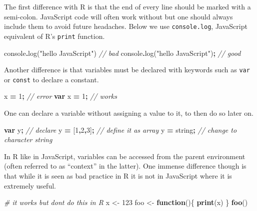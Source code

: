 \documentclass[
]{krantz}
\makeatletter
\newenvironment{Shaded}{\begin{snugshade}}{\end{snugshade}}
\newcommand{\BuiltInTok}[1]{#1}
\newcommand{\CommentTok}[1]{\textcolor[rgb]{0.37,0.37,0.37}{\textit{#1}}}
\newcommand{\ControlFlowTok}[1]{\textcolor[rgb]{0.27,0.27,0.27}{\textbf{#1}}}
\newcommand{\DecValTok}[1]{\textcolor[rgb]{0.06,0.06,0.06}{#1}}
\newcommand{\FunctionTok}[1]{\textcolor[rgb]{0,0,0}{#1}}
\newcommand{\KeywordTok}[1]{\textcolor[rgb]{0.27,0.27,0.27}{\textbf{#1}}}
\newcommand{\NormalTok}[1]{#1}
\newcommand{\OperatorTok}[1]{\textcolor[rgb]{0.43,0.43,0.43}{\textbf{#1}}}
\newcommand{\StringTok}[1]{\textcolor[rgb]{0.5,0.5,0.5}{#1}}
\newenvironment{kframe}{%
\medskip{}
\setlength{\fboxsep}{.8em}
 \def\at@end@of@kframe{}%
 \ifinner\ifhmode%
  \def\at@end@of@kframe{\end{minipage}}%
  \begin{minipage}{\columnwidth}%
 \fi\fi%
 \def\FrameCommand##1{\hskip\@totalleftmargin \hskip-\fboxsep
 \colorbox{shadecolor}{##1}\hskip-\fboxsep
     \hskip-\linewidth \hskip-\@totalleftmargin \hskip\columnwidth}%
 \MakeFramed {\advance\hsize-\width
   \@totalleftmargin\z@ \linewidth\hsize
   \@setminipage}}%
 {\par\unskip\endMakeFramed%
 \at@end@of@kframe}
\renewenvironment{Shaded}{\begin{kframe}}{\end{kframe}}
\makeatother
\begin{document}
The first difference with R is that the end of every line should be marked with a semi-colon. JavaScript code will often work without but one should always include them to avoid future headaches. Below we use \texttt{console.log}, JavaScript equivalent of R's \texttt{print} function.

\begin{Shaded}
\begin{Highlighting}[]
\BuiltInTok{console}\OperatorTok{.}\FunctionTok{log}\NormalTok{(}\StringTok{"hello JavaScript"}\NormalTok{) }\CommentTok{// bad}
\BuiltInTok{console}\OperatorTok{.}\FunctionTok{log}\NormalTok{(}\StringTok{"hello JavaScript"}\NormalTok{)}\OperatorTok{;} \CommentTok{// good}
\end{Highlighting}
\end{Shaded}

Another difference is that variables must be declared with keywords such as \texttt{var} or \texttt{const} to declare a constant.

\begin{Shaded}
\begin{Highlighting}[]
\NormalTok{x }\OperatorTok{=} \DecValTok{1}\OperatorTok{;} \CommentTok{// error}
\KeywordTok{var}\NormalTok{ x }\OperatorTok{=} \DecValTok{1}\OperatorTok{;} \CommentTok{// works}
\end{Highlighting}
\end{Shaded}

One can declare a variable without assigning a value to it, to then do so later on.

\begin{Shaded}
\begin{Highlighting}[]
\KeywordTok{var}\NormalTok{ y}\OperatorTok{;} \CommentTok{// declare }
\NormalTok{y }\OperatorTok{=}\NormalTok{ [}\DecValTok{1}\OperatorTok{,}\DecValTok{2}\OperatorTok{,}\DecValTok{3}\NormalTok{]}\OperatorTok{;} \CommentTok{// define it as array}
\NormalTok{y }\OperatorTok{=} \StringTok{\textquotesingle{}string\textquotesingle{}}\OperatorTok{;} \CommentTok{// change to character string}
\end{Highlighting}
\end{Shaded}

In R like in JavaScript, variables can be accessed from the parent environment (often referred to as ``context'' in the latter). One immense difference though is that while it is seen as bad practice in R it is not in JavaScript where it is extremely useful.

\begin{Shaded}
\begin{Highlighting}[]
\CommentTok{\# it works but don\textquotesingle{}t do this in R}
\NormalTok{x \textless{}{-}}\StringTok{ }\DecValTok{123}
\NormalTok{foo \textless{}{-}}\StringTok{ }\ControlFlowTok{function}\NormalTok{()\{}
  \KeywordTok{print}\NormalTok{(x)}
\NormalTok{\}}
\KeywordTok{foo}\NormalTok{()}
\end{Highlighting}
\end{Shaded}
\end{document}
